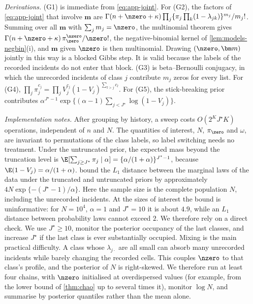 \emph{Derivations.} (G1) is immediate from \eqref{eq:app-joint}. For (G2), the factors of \eqref{eq:app-joint} that involve $\bm m$ are $\Gamma(n+\nzero+\kappa)\prod_j\{\pi_j\prod_k(1-\lambda_{jk})\}^{m_j}/m_j!$. Summing over all $\bm m$ with $\sum_jm_j=\nzero$, the multinomial theorem gives $\Gamma(n+\nzero+\kappa)\,\pi_{\zero}^{\nzero}/\nzero!$, the negative-binomial kernel of \cref{lem:models-negbin}(i), and $\bm m$ given $\nzero$ is then multinomial. Drawing $(\nzero,\bm m)$ jointly in this way is a blocked Gibbs step. It is valid because the labels of the recorded incidents do not enter that block. (G3) is beta--Bernoulli conjugacy, in which the unrecorded incidents of class $j$ contribute $m_j$ zeros for every list. For (G4), $\prod_j\pi_j^{c_j}=\prod_jV_j^{c_j}(1-V_j)^{\sum_{l>j}c_l}$. For (G5), the stick-breaking prior contributes $\alpha^{J^\star-1}\exp\{(\alpha-1)\sum_{j<J^\star}\log(1-V_j)\}$.

\emph{Implementation notes.} After grouping by history, a sweep costs $O(2^KJ^\star K)$ operations, independent of $n$ and $N$. The quantities of interest, $N$, $\pi_{\zero}$ and $\omega$, are invariant to permutations of the class labels, so label switching needs no treatment. Under the untruncated prior, the expected mass beyond the truncation level is $\E[\sum_{j\ge J^\star}\pi_j\mid\alpha]=\{\alpha/(1+\alpha)\}^{J^\star-1}$, because $\E(1-V_j)=\alpha/(1+\alpha)$.  bound the $L_1$ distance between the marginal laws of the data under the truncated and untruncated priors by approximately $4N\exp\{-(J^\star-1)/\alpha\}$. Here the sample size is the complete population $N$, including the unrecorded incidents. At the sizes of interest the bound is uninformative: for $N=10^4$, $\alpha=1$ and $J^\star=10$ it is about $4.9$, while an $L_1$ distance between probability laws cannot exceed $2$. We therefore rely on a direct check. We use $J^\star\ge10$, monitor the posterior occupancy of the last classes, and increase $J^\star$ if the last class is ever substantially occupied. Mixing is the main practical difficulty. A class whose $\lambda_{j\cdot}$ are all small can absorb many unrecorded incidents while barely changing the recorded cells. This couples $\nzero$ to that class's profile, and the posterior of $N$ is right-skewed. We therefore run at least four chains, with $\nzero$ initialised at overdispersed values (for example, from the lower bound of \cref{thm:chao} up to several times it), monitor $\log N$, and summarise by posterior quantiles rather than the mean alone.

